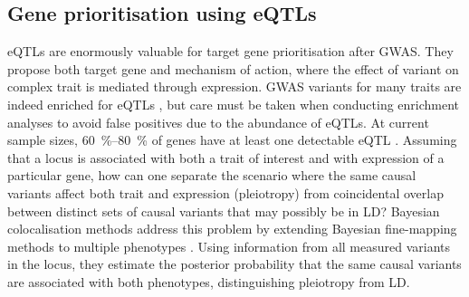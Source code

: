 \subsection{Gene prioritisation using eQTLs}
\label{subsec:intro_genePrioritisationUsingeQTL}

\glspl{eQTL} are enormously valuable for target gene prioritisation after \gls{GWAS}.
They propose both target gene and mechanism of action, where the effect of variant on complex trait is mediated through expression.
\Gls{GWAS} variants for many traits are indeed enriched for \glspl{eQTL} \autocite{nicolae2010TraitAssociatedSNPsAre}, 
but care must be taken when conducting enrichment analyses to avoid false positives due to the abundance of \glspl{eQTL}.
At current sample sizes, \SIrange{60}{80}{\percent} of genes have at least one detectable \gls{eQTL} \autocite{vandiedonck2017GeneticAssociationMolecular,vosa2018UnravelingPolygenicArchitecture}.
Assuming that a locus is associated with both a trait of interest and with expression of a particular gene,
how can one separate the scenario where the same causal variants affect both trait and expression (pleiotropy) from coincidental overlap between distinct sets of causal variants that may possibly be in \gls{LD}?
Bayesian colocalisation methods address this problem by extending Bayesian fine-mapping methods to multiple phenotypes \autocite{burgess2018InferringCausalRelationships,wallace2020ElicitingPriorsRelaxing,hukku2020ProbabilisticColocalizationGenetic}.
Using information from all measured variants in the locus, 
they estimate the posterior probability that the same causal variants are associated with both phenotypes,
distinguishing pleiotropy from \gls{LD}.

